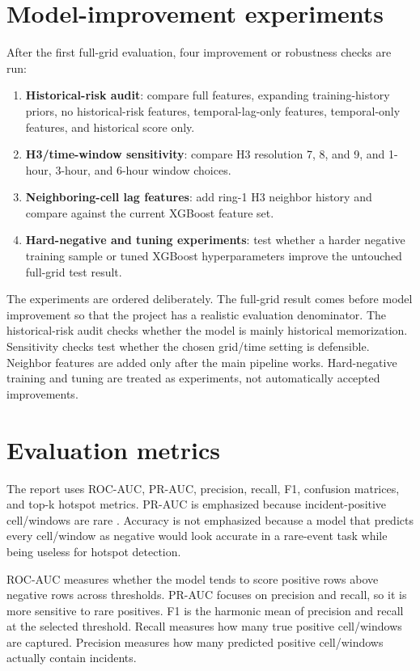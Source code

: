 \section{Model-improvement experiments}

After the first full-grid evaluation, four improvement or robustness checks are run:

\begin{enumerate}
    \item \textbf{Historical-risk audit}: compare full features, expanding training-history priors, no historical-risk features, temporal-lag-only features, temporal-only features, and historical score only.
    \item \textbf{H3/time-window sensitivity}: compare H3 resolution 7, 8, and 9, and 1-hour, 3-hour, and 6-hour window choices.
    \item \textbf{Neighboring-cell lag features}: add ring-1 H3 neighbor history and compare against the current XGBoost feature set.
    \item \textbf{Hard-negative and tuning experiments}: test whether a harder negative training sample or tuned XGBoost hyperparameters improve the untouched full-grid test result.
\end{enumerate}

The experiments are ordered deliberately. The full-grid result comes before model improvement so that the project has a realistic evaluation denominator. The historical-risk audit checks whether the model is mainly historical memorization. Sensitivity checks test whether the chosen grid/time setting is defensible. Neighbor features are added only after the main pipeline works. Hard-negative training and tuning are treated as experiments, not automatically accepted improvements.

\section{Evaluation metrics}

The report uses ROC-AUC, PR-AUC, precision, recall, F1, confusion matrices, and top-k hotspot metrics. PR-AUC is emphasized because incident-positive cell/windows are rare \cite{saito2015prauc}. Accuracy is not emphasized because a model that predicts every cell/window as negative would look accurate in a rare-event task while being useless for hotspot detection.

ROC-AUC measures whether the model tends to score positive rows above negative rows across thresholds. PR-AUC focuses on precision and recall, so it is more sensitive to rare positives. F1 is the harmonic mean of precision and recall at the selected threshold. Recall measures how many true positive cell/windows are captured. Precision measures how many predicted positive cell/windows actually contain incidents.

